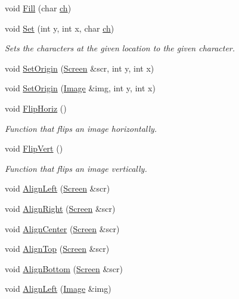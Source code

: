 \begin{DoxyCompactItemize}
void \hyperlink{classImage_a39486b75d05a1d3c0206a9ce909f3571}{Fill} (char \hyperlink{classImage_a2d2bff881014df332b1086483d0eb0e9}{ch})
\item 
void \hyperlink{classImage_a4fbbffe74cd76d884f1e2a96d0bb6c09}{Set} (int y, int x, char \hyperlink{classImage_a2d2bff881014df332b1086483d0eb0e9}{ch})
\begin{DoxyCompactList}\small\item\em Sets the characters at the given location to the given character. \end{DoxyCompactList}\item 
void \hyperlink{classImage_ab68774143becf8906bf8b1931511cb66}{Set\-Origin} (\hyperlink{classScreen}{Screen} \&scr, int y, int x)
\item 
void \hyperlink{classImage_adfe7a1b2cf0bd7893cdd55a646da8d77}{Set\-Origin} (\hyperlink{classImage}{Image} \&img, int y, int x)
\item 
void \hyperlink{classImage_a1c7560c1e8f95eb0a879fb4fac72fa28}{Flip\-Horiz} ()
\begin{DoxyCompactList}\small\item\em Function that flips an image horizontally. \end{DoxyCompactList}\item 
void \hyperlink{classImage_a94fe8fd85b9ef3461c2576d29ebd3a86}{Flip\-Vert} ()
\begin{DoxyCompactList}\small\item\em Function that flips an image vertically. \end{DoxyCompactList}\item 
void \hyperlink{classImage_a605b3921fed112ffb8a371341c68eb4c}{Align\-Left} (\hyperlink{classScreen}{Screen} \&scr)
\item 
void \hyperlink{classImage_abbb7cdfe276a373ad9b50d5be641eeef}{Align\-Right} (\hyperlink{classScreen}{Screen} \&scr)
\item 
void \hyperlink{classImage_a691da8aebb2d92b7471da96a19e0fc22}{Align\-Center} (\hyperlink{classScreen}{Screen} \&scr)
\item 
void \hyperlink{classImage_a5048f1f5a975185d24a08247dbce1568}{Align\-Top} (\hyperlink{classScreen}{Screen} \&scr)
\item 
void \hyperlink{classImage_adfd7cfe672b8950fa7cfcff8022169b0}{Align\-Bottom} (\hyperlink{classScreen}{Screen} \&scr)
\item 
void \hyperlink{classImage_a863eee8dfbe927d73fba705844eb3117}{Align\-Left} (\hyperlink{classImage}{Image} \&img)
\item 

\end{DoxyCompactItemize}

